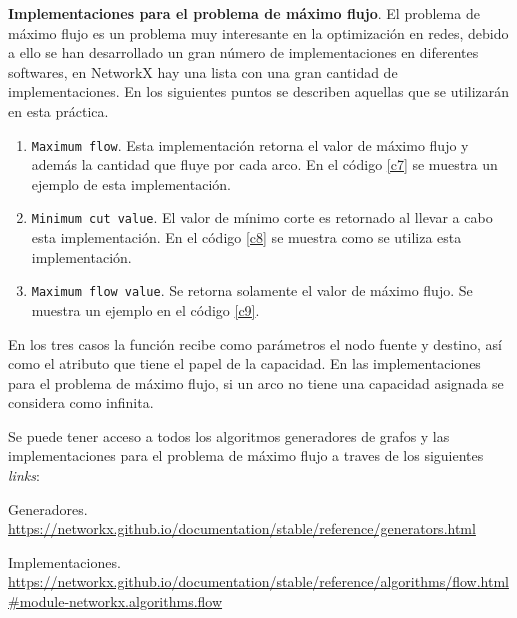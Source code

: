 \documentclass[12pt]{article}
\begin{document}
\textbf{Implementaciones para el problema de máximo flujo}. El problema de máximo flujo es un problema muy interesante en la optimización en redes, debido a ello se han desarrollado un gran número de implementaciones en diferentes softwares, en NetworkX hay una lista con una gran cantidad de implementaciones. En los siguientes puntos se describen aquellas que se utilizarán en esta práctica. 

\begin{enumerate}[\hspace*{0.0cm}]
\item \texttt{Maximum flow}. Esta implementación retorna el valor de máximo flujo y además la cantidad que fluye por cada arco. En el código \ref{c7} se muestra un ejemplo de esta implementación.

 \label{c7}


\item \texttt{Minimum cut value}. El valor de mínimo corte es retornado al llevar a cabo esta implementación. En el código \ref{c8} se muestra como se utiliza esta implementación.

 \label{c8}

 
\item \texttt{Maximum flow value}. Se retorna solamente el valor de máximo flujo. Se muestra un ejemplo en el código \ref{c9}.

 \label{c9}


\end{enumerate}

En los tres casos la función recibe como parámetros el nodo fuente y destino, así como el atributo que tiene el papel de la capacidad. En las implementaciones para el problema de máximo flujo, si un arco no tiene una capacidad asignada se considera como infinita. 

Se puede tener acceso a todos los algoritmos generadores de grafos y las implementaciones para el problema de máximo flujo a traves de los siguientes \textit{links}:

Generadores. \\
\small {\url{https://networkx.github.io/documentation/stable/reference/generators.html}}

Implementaciones. \\
\small{\url{https://networkx.github.io/documentation/stable/reference/algorithms/flow.html#module-networkx.algorithms.flow}}
\end{document}
